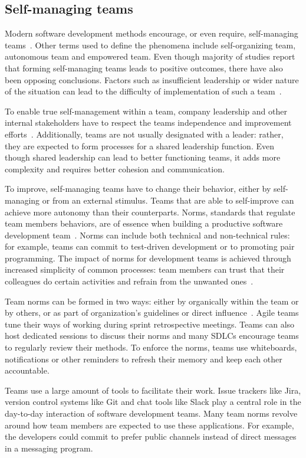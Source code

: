 \subsection{Self-managing teams}

Modern software development methods encourage, or even require, self-managing teams~\cite{moe_teamwork_2010}. Other terms used to define the phenomena include self-organizing team, autonomous team and empowered team. Even though majority of studies report that forming self-managing teams leads to positive outcomes, there have also been opposing conclusions. Factors such as insufficient leadership or wider nature of the situation can lead to the difficulty of implementation of such a team~\cite{moe_teamwork_2010}. 

To enable true self-management within a team, company leadership and other internal stakeholders have to respect the teams independence and improvement efforts~\cite{moe_overcoming_2010}. Additionally, teams are not usually designated with a leader: rather, they are expected to form processes for a shared leadership function. Even though shared leadership can lead to better functioning teams, it adds more complexity and requires better cohesion and communication.~\cite{solansky_leadership_2008}

To improve, self-managing teams have to change their behavior, either by self-managing or from an external stimulus. Teams that are able to self-improve can achieve more autonomy than their counterparts. Norms, standards that regulate team members behaviors, are of essence when building a productive software development team~\cite{abrahamsson_exploring_2016}. Norms can include both technical and non-technical rules: for example, teams can commit to test-driven development or to promoting pair programming. The impact of norms for development teams is achieved through increased simplicity of common processes: team members can trust that their colleagues do certain activities and refrain from the unwanted ones~\cite{abrahamsson_exploring_2016}. 

Team norms can be formed in two ways: either by organically within the team or by others, or as part of organization's guidelines or direct influence~\cite{teh_social_2012}. Agile teams tune their ways of working during sprint retrospective meetings. Teams can also host dedicated sessions to discuss their norms and many SDLCs encourage teams to regularly review their methods. To enforce the norms, teams use whiteboards, notifications or other reminders to refresh their memory and keep each other accountable. 

Teams use a large amount of tools to facilitate their work. Issue trackers like Jira, version control systems like Git and chat tools like Slack play a central role in the day-to-day interaction of software development teams. Many team norms revolve around how team members are expected to use these applications. For example, the developers could commit to prefer public channels instead of direct messages in a messaging program. 



